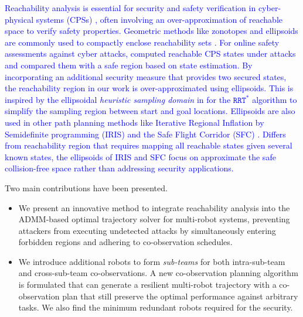 \documentclass[10pt,twocolumn,twoside]{IEEEtran}
\newcommand{\new}[1]{\textcolor{blue}{#1}}
\begin{document}
\new{Reachability analysis is essential for security and safety verification in cyber-physical systems (CPSs) \cite{gueguen2009safety, ding2020secure}, often involving an over-approximation of reachable space to verify safety properties. Geometric methods like zonotopes and ellipsoids are commonly used to compactly enclose reachability sets \cite{kurzhanski2000ellipsoidal, lakhal2019interval, maiga2015comprehensive}. For online safety assessments against cyber attacks, \cite{kwon2017reachability} computed reachable CPS states under attacks and compared them with a safe region based on state estimation. By incorporating an additional security measure that provides two secured states, the reachability region in our work is over-approximated using ellipsoids. This is inspired by the ellipsoidal \emph{heuristic sampling domain} in \cite{gammell2014informed} for the $\mathtt{RRT^*}$ algorithm to simplify the sampling region between start and goal locations. Ellipsoids are also used in other path planning methods like Iterative Regional Inflation by Semidefinite programming (IRIS) \cite{deits2015computing, ray2022free} and the Safe Flight Corridor (SFC) \cite{liu2017planning, fan2024flying}. Differs from reachability region that requires mapping all reachable states given several known states, the ellipsoids of IRIS and SFC focus on approximate the safe collision-free space rather than addressing security applications.}

\noindent{} 
Two main contributions have been presented. 
\begin{itemize}
  \item We present an innovative method to integrate reachability analysis into the ADMM-based optimal trajectory solver for multi-robot systems, preventing attackers from executing undetected attacks by simultaneously entering forbidden regions and adhering to co-observation schedules.
  \item We introduce additional robots to form \emph{sub-teams} for both intra-sub-team and cross-sub-team co-observations. A new co-observation planning algorithm is formulated that can generate a resilient multi-robot trajectory with a co-observation plan that still preserve the optimal performance against arbitrary tasks. We also find the minimum redundant robots required for the security.
\end{itemize}
\end{document}
